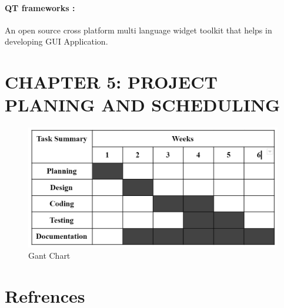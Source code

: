 \documentclass{article}
\begin{document}
\paragraph{QT frameworks :} An open source cross platform multi language widget toolkit that helps in developing GUI Application.

\clearpage

\section{CHAPTER 5: PROJECT PLANING AND SCHEDULING}
\begin{figure}[h]
    \centerline{\includegraphics[width = 190mm]{chart.png}}
    \caption{Gant Chart}
    \label{fig}
\end{figure}

\begin{figure}[h]
\end{figure}

\clearpage

\section{Refrences}
\end{document}
